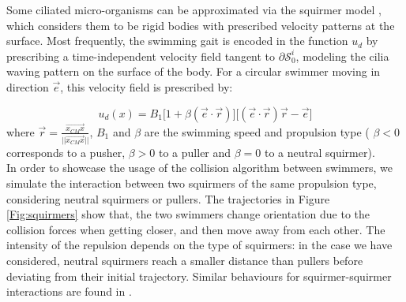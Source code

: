 \documentclass[graybox]{svmult}
\newcommand{\Solid}{\mathcal{S}} %
\begin{document}
Some ciliated micro-organisms can be approximated via the squirmer model \cite{blake1971spherical,lighthill1952squirming}, which considers them to be rigid bodies with prescribed velocity patterns at the surface. Most frequently, the swimming gait is encoded in the function $u_d$ by prescribing a time-independent velocity field tangent to $\partial \Solid_0^i$, modeling the cilia waving pattern on the surface of the body. For a circular swimmer moving in direction $\overrightarrow{e}$, this velocity field is prescribed by:

$$
u_d(x) =  B_1 \Bigg[ 1 + \beta (\overrightarrow{e} \cdot \overrightarrow{r}) \Bigg] \Bigg[(\overrightarrow{e} \cdot \overrightarrow{r})\overrightarrow{r} - \overrightarrow{e} \Bigg]
$$ 
where  $\overrightarrow{r} = \frac{\overrightarrow{x_{CM}x}}{||\overrightarrow{x_{CM}x}||}$, $B_1$ and $\beta$ are the swimming speed and propulsion type ( $\beta < 0$ corresponds to a pusher, $\beta > 0$ to a puller and $\beta = 0$ to a neutral squirmer).\\
In order to showcase the usage of the collision algorithm between swimmers, we simulate the interaction between two squirmers of the same propulsion type, considering neutral squirmers or pullers. The trajectories in Figure \ref{Fig:squirmers} show that, the two swimmers change orientation due to the collision forces when getting closer, and then move away from each other.
The intensity of the repulsion depends on the type of squirmers: in the case we have considered, neutral squirmers reach a smaller distance than pullers before deviating from their initial trajectory. Similar behaviours for squirmer-squirmer interactions are found in \cite{ishikawa2006hydrodynamic}. 
\end{document}
